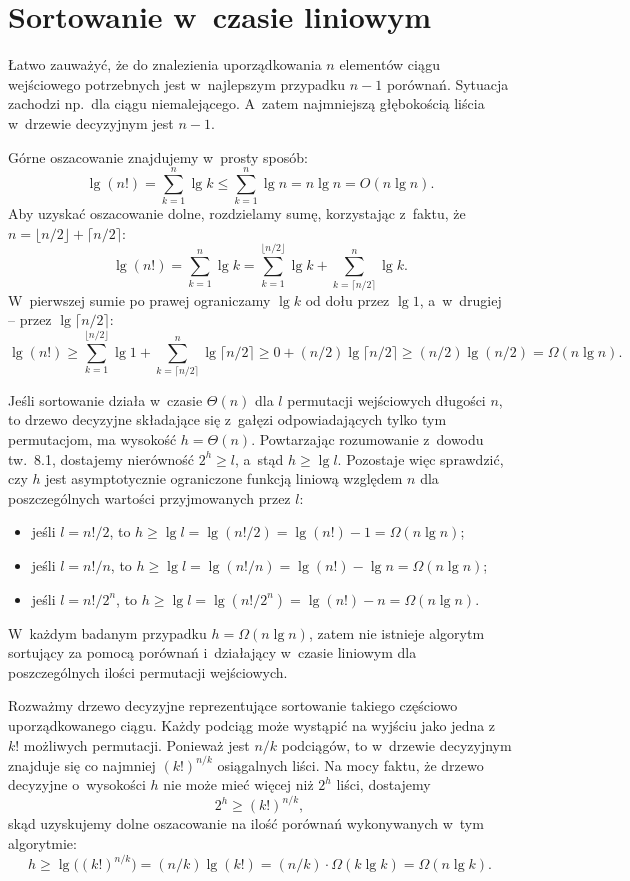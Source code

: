 \chapter{Sortowanie w~czasie liniowym}


\exercise %
Łatwo zauważyć, że do znalezienia uporządkowania $n$ elementów ciągu wejściowego potrzebnych jest w~najlepszym przypadku $n-1$ porównań.
Sytuacja zachodzi np.\ dla ciągu niemalejącego.
A~zatem najmniejszą głębokością liścia w~drzewie decyzyjnym jest $n-1$.

\exercise %
Górne oszacowanie znajdujemy w~prosty sposób:
\[
	\lg(n!) = \sum_{k=1}^n\lg k \le \sum_{k=1}^n\lg n = n\lg n = O(n\lg n).
\]
Aby uzyskać oszacowanie dolne, rozdzielamy sumę, korzystając z~faktu, że $n=\lfloor n/2\rfloor+\lceil n/2\rceil$:
\[
	\lg(n!) = \sum_{k=1}^n\lg k = \sum_{k=1}^{\lfloor n/2\rfloor}\lg k+\sum_{k=\lceil n/2\rceil}^n\lg k.
\]
W~pierwszej sumie po prawej ograniczamy $\lg k$ od dołu przez $\lg1$, a~w~drugiej -- przez $\lg\lceil n/2\rceil$:
\[
	\lg(n!) \ge \sum_{k=1}^{\lfloor n/2\rfloor}\lg1+\sum_{k=\lceil n/2\rceil}^n\lg\lceil n/2\rceil \ge 0+(n/2)\lg\lceil n/2\rceil \ge (n/2)\lg(n/2) = \Omega(n\lg n).
\]

\exercise %
Jeśli sortowanie działa w~czasie $\Theta(n)$ dla $l$ permutacji wejściowych długości $n$, to drzewo decyzyjne składające się z~gałęzi odpowiadających tylko tym permutacjom, ma wysokość $h=\Theta(n)$.
Powtarzając rozumowanie z~dowodu tw.~8.1, dostajemy nierówność $2^h\ge l$, a~stąd $h\ge\lg l$.
Pozostaje więc sprawdzić, czy $h$ jest asymptotycznie ograniczone funkcją liniową względem $n$ dla poszczególnych wartości przyjmowanych przez $l$:
\begin{itemize}
	\item jeśli $l=n!/2$, to $h\ge\lg l=\lg(n!/2)=\lg(n!)-1=\Omega(n\lg n)$;
	\item jeśli $l=n!/n$, to $h\ge\lg l=\lg(n!/n)=\lg(n!)-\lg n=\Omega(n\lg n)$;
	\item jeśli $l=n!/2^n$, to $h\ge\lg l=\lg(n!/2^n)=\lg(n!)-n=\Omega(n\lg n)$.
\end{itemize}
W~każdym badanym przypadku $h=\Omega(n\lg n)$, zatem nie istnieje algorytm sortujący za pomocą porównań i~działający w~czasie liniowym dla poszczególnych ilości permutacji wejściowych.

\exercise %
Rozważmy drzewo decyzyjne reprezentujące sortowanie takiego częściowo uporządkowanego ciągu.
Każdy podciąg może wystąpić na wyjściu jako jedna z~$k!$ możliwych permutacji.
Ponieważ jest $n/k$ podciągów, to w~drzewie decyzyjnym znajduje się co najmniej $(k!)^{n/k}$ osiągalnych liści.
Na mocy faktu, że drzewo decyzyjne o~wysokości $h$ nie może mieć więcej niż $2^h$ liści, dostajemy
\[
	2^h \ge (k!)^{n/k},
\]
skąd uzyskujemy dolne oszacowanie na ilość porównań wykonywanych w~tym algorytmie:
\[
	h \ge \lg\bigl((k!)^{n/k}\bigr) = (n/k)\lg(k!) = (n/k)\cdot\Omega(k\lg k) = \Omega(n\lg k).
\]

